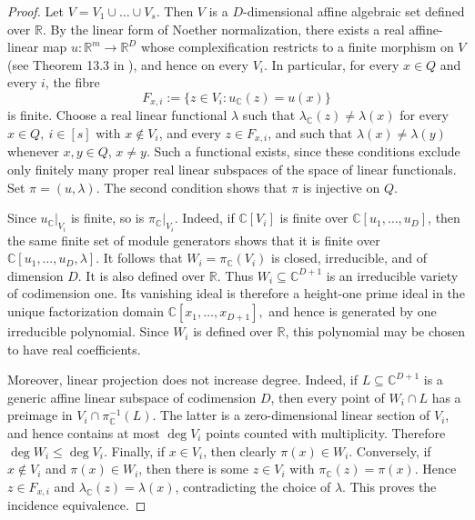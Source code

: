 \documentclass[11pt]{article}
\theoremstyle{plain}
\theoremstyle{definition}
\begin{document}
	\begin{proof}
		Let $V=V_1\cup\dots\cup V_s$. Then $V$ is a $D$-dimensional affine algebraic set defined over $\mathbb{R}$. By the linear form of Noether normalization, there exists a real
		affine-linear map
		$u:\mathbb R^m\longrightarrow\mathbb R^D$
		whose complexification restricts to a finite morphism on $V$ 
		 (see Theorem 13.3 in \cite{Eisenbud}), and hence on every $V_i$. In particular, for every
		$x\in Q$ and every $i$, the fibre
		\[
		F_{x,i}:=\{z\in V_i:u_{\mathbb C}(z)=u(x)\}
		\]
		is finite. Choose a real linear functional $\lambda$ such that $\lambda_{\mathbb C}(z)\neq\lambda(x)$ for every $x\in Q,\ i\in[s]$ with $x\notin V_i$, and every $z\in F_{x,i}$,
		and such that	$\lambda(x)\neq\lambda(y)$ whenever $x,y\in Q$, $x\neq y$.
		Such a functional exists, since these conditions exclude only
		finitely many proper real linear subspaces of the space of linear
		functionals. Set $\pi=(u,\lambda).$
		The second condition shows that $\pi$ is injective on $Q$.
		
		Since $u_{\mathbb C}|_{V_i}$ is finite, so is
		$\pi_{\mathbb C}|_{V_i}$. Indeed, if $\mathbb C[V_i]$ is finite over
		$\mathbb C[u_1,\ldots,u_D]$, then the same finite set of module
		generators shows that it is finite over
		$\mathbb C[u_1,\ldots,u_D,\lambda].$
		It follows that $W_i=\pi_{\mathbb C}(V_i)$ is closed, irreducible,
		and of dimension $D$. It is also defined over $\mathbb R$.	Thus $W_i\subseteq\mathbb C^{D+1}$ is an irreducible variety of codimension one. Its vanishing
		ideal is therefore a height-one prime ideal in the unique
		factorization domain
		$\mathbb C[x_1,\ldots,x_{D+1}],$
		and hence is generated by one irreducible polynomial. Since $W_i$ is
		defined over $\mathbb R$, this polynomial may be chosen to have real
		coefficients.
		
		Moreover, linear projection does not increase degree. Indeed, if
		$L\subseteq\mathbb C^{D+1}$ is a generic affine linear subspace of
		codimension $D$, then every point of $W_i\cap L$ has a preimage in
		$V_i\cap\pi_{\mathbb C}^{-1}(L).$
		The latter is a zero-dimensional linear section of $V_i$, and hence
		contains at most $\deg V_i$ points counted with multiplicity.
		Therefore $\deg W_i\leq\deg V_i.$
		Finally, if $x\in V_i$, then clearly $\pi(x)\in W_i$. Conversely, if
		$x\notin V_i$ and $\pi(x)\in W_i$, then there is some $z\in V_i$ with
		$\pi_{\mathbb C}(z)=\pi(x)$. Hence $z\in F_{x,i}$ and
		$\lambda_{\mathbb C}(z)=\lambda(x)$, contradicting the choice of
		$\lambda$. This proves the incidence equivalence.
	\end{proof}
\end{document}
